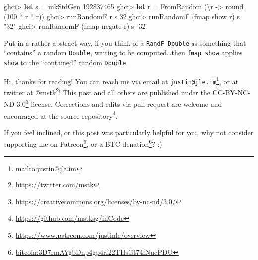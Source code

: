 \documentclass[]{article}
\newenvironment{Shaded}{}{}
\newcommand{\DataTypeTok}[1]{\textcolor[rgb]{0.56,0.13,0.00}{#1}}
\newcommand{\DecValTok}[1]{\textcolor[rgb]{0.25,0.63,0.44}{#1}}
\newcommand{\FunctionTok}[1]{\textcolor[rgb]{0.02,0.16,0.49}{#1}}
\newcommand{\KeywordTok}[1]{\textcolor[rgb]{0.00,0.44,0.13}{\textbf{#1}}}
\newcommand{\NormalTok}[1]{#1}
\newcommand{\OtherTok}[1]{\textcolor[rgb]{0.00,0.44,0.13}{#1}}
\newcommand{\StringTok}[1]{\textcolor[rgb]{0.25,0.44,0.63}{#1}}
\renewcommand{\href}[2]{#2\footnote{\url{#1}}}
\begin{document}
\begin{Shaded}
\begin{Highlighting}[]
\NormalTok{ghci}\FunctionTok{>} \KeywordTok{let}\NormalTok{ s }\FunctionTok{=}\NormalTok{ mkStdGen }\DecValTok{192837465}
\NormalTok{ghci}\FunctionTok{>} \KeywordTok{let}\NormalTok{ r }\FunctionTok{=} \DataTypeTok{FromRandom}\NormalTok{ (\textbackslash{}r }\OtherTok{->}\NormalTok{ round (}\DecValTok{100} \FunctionTok{*}\NormalTok{ r }\FunctionTok{*}\NormalTok{ r))}
\NormalTok{ghci}\FunctionTok{>}\NormalTok{ runRandomF r s}
\DecValTok{32}
\NormalTok{ghci}\FunctionTok{>}\NormalTok{ runRandomF (fmap show r) s}
\StringTok{"32"}
\NormalTok{ghci}\FunctionTok{>}\NormalTok{ runRandomF (fmap negate r) s}
\FunctionTok{-}\DecValTok{32}
\end{Highlighting}
\end{Shaded}

Put in a rather abstract way, if you think of a \texttt{RandF\ Double} as
something that ``contains'' a random \texttt{Double}, waiting to be
computed\ldots{}then \texttt{fmap\ show} applies \texttt{show} to the
``contained'' random \texttt{Double}.

Hi, thanks for reading! You can reach me via email at
\href{mailto:justin@jle.im}{\nolinkurl{justin@jle.im}}, or at twitter at
\href{https://twitter.com/mstk}{@mstk}! This post and all others are published
under the \href{https://creativecommons.org/licenses/by-nc-nd/3.0/}{CC-BY-NC-ND
3.0} license. Corrections and edits via pull request are welcome and encouraged
at \href{https://github.com/mstksg/inCode}{the source repository}.

If you feel inclined, or this post was particularly helpful for you, why not
consider \href{https://www.patreon.com/justinle/overview}{supporting me on
Patreon}, or a \href{bitcoin:3D7rmAYgbDnp4gp4rf22THsGt74fNucPDU}{BTC donation}?
:)
\end{document}
